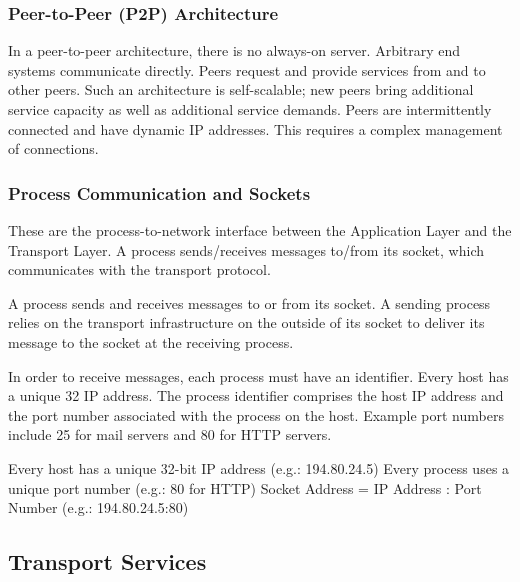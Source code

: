 \subsubsection{Peer-to-Peer (P2P) Architecture}

In a peer-to-peer architecture, there is no always-on server.
Arbitrary end systems communicate directly.
Peers request and provide services from and to other peers.
Such an architecture is self-scalable; new peers bring additional service capacity as well as additional service demands.
Peers are intermittently connected and have dynamic IP addresses.
This requires a complex management of connections.

\subsubsection{Process Communication and Sockets}
These are the process-to-network
interface between the Application Layer
and the Transport Layer.
A process sends/receives messages
to/from its socket, which communicates
with the transport protocol.

A process sends and receives messages to or from its socket.
A sending process relies on the transport infrastructure on the outside of its socket to deliver its message to the socket at the receiving process.

In order to receive messages, each process must have an identifier.
Every host has a unique \SI{32}{\bit} IP address.
The process identifier comprises the host IP address and the port number associated with the process on the host.
Example port numbers include \num{25} for mail servers and \num{80} for HTTP servers.

Every host has a unique 32-bit IP address (e.g.: 194.80.24.5)
\newline
Every process uses a unique port number (e.g.: 80 for HTTP)
\newline
Socket Address = IP Address : Port Number (e.g.: 194.80.24.5:80)

\subsection{Transport Services}

